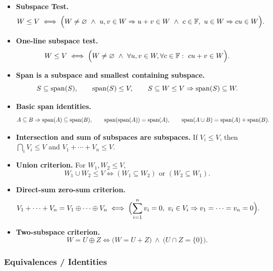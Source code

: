 \begin{itemize}[leftmargin=*]
\item \textbf{Subspace Test.}
\[
W\le V \iff \Bigl(W\neq\varnothing\ \wedge\ u,v\in W\Rightarrow u+v\in W\ \wedge\ c\in\mathbb F,\ u\in W\Rightarrow cu\in W\Bigr).
\]

\item \textbf{One-line subspace test.}
\[
W\le V \iff \Bigl(W\neq\varnothing\ \wedge\ \forall u,v\in W,\forall c\in\mathbb F:\ cu+v\in W\Bigr).
\]

\item \textbf{Span is a subspace and smallest containing subspace.}
\[
S\subseteq \operatorname{span}(S),\qquad \operatorname{span}(S)\le V,
\qquad
S\subseteq W\le V\Rightarrow \operatorname{span}(S)\subseteq W.
\]

\item \textbf{Basic span identities.}
\[
A\subseteq B\Rightarrow \operatorname{span}(A)\subseteq \operatorname{span}(B),
\qquad
\operatorname{span}(\operatorname{span}(A))=\operatorname{span}(A),
\qquad
\operatorname{span}(A\cup B)=\operatorname{span}(A)+\operatorname{span}(B).
\]

\item \textbf{Intersection and sum of subspaces are subspaces.} If $V_i\le V$, then $\bigcap_i V_i\le V$ and $V_1+\cdots+V_n\le V$.

\item \textbf{Union criterion.} For $W_1,W_2\le V$,
\[
W_1\cup W_2\le V \iff (W_1\subseteq W_2)\text{ or }(W_2\subseteq W_1).
\]

\item \textbf{Direct-sum zero-sum criterion.}
\[
V_1+\cdots+V_n=V_1\oplus\cdots\oplus V_n
\iff
\Bigl(\sum_{i=1}^n v_i=0,\ v_i\in V_i\Rightarrow v_1=\cdots=v_n=0\Bigr).
\]

\item \textbf{Two-subspace criterion.}
\[
W=U\oplus Z \iff \bigl(W=U+Z\bigr)\ \wedge\ \bigl(U\cap Z=\{0\}\bigr).
\]
\end{itemize}

\subsubsection*{Equivalences / Identities}

